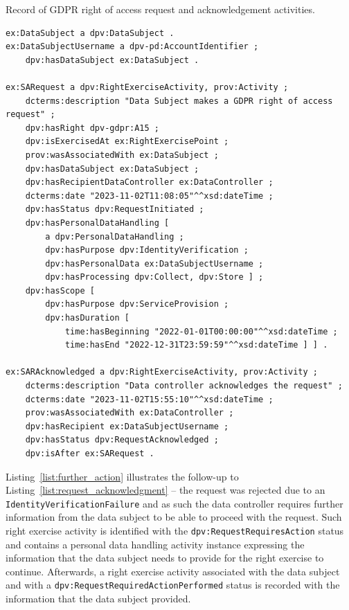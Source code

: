 \begin{listing}[htp]
\caption{Record of GDPR right of access request and acknowledgement activities.}
\label{list:request_acknowledgment}
\begin{verbatim}
ex:DataSubject a dpv:DataSubject .
ex:DataSubjectUsername a dpv-pd:AccountIdentifier ;
    dpv:hasDataSubject ex:DataSubject .

ex:SARequest a dpv:RightExerciseActivity, prov:Activity ;
    dcterms:description "Data Subject makes a GDPR right of access request" ;
    dpv:hasRight dpv-gdpr:A15 ;
    dpv:isExercisedAt ex:RightExercisePoint ;
    prov:wasAssociatedWith ex:DataSubject ;
    dpv:hasDataSubject ex:DataSubject ;
    dpv:hasRecipientDataController ex:DataController ;
    dcterms:date "2023-11-02T11:08:05"^^xsd:dateTime ;
    dpv:hasStatus dpv:RequestInitiated ;
    dpv:hasPersonalDataHandling [
        a dpv:PersonalDataHandling ;
        dpv:hasPurpose dpv:IdentityVerification ;
        dpv:hasPersonalData ex:DataSubjectUsername ;
        dpv:hasProcessing dpv:Collect, dpv:Store ] ;
    dpv:hasScope [
        dpv:hasPurpose dpv:ServiceProvision ;
        dpv:hasDuration [
            time:hasBeginning "2022-01-01T00:00:00"^^xsd:dateTime ;
            time:hasEnd "2022-12-31T23:59:59"^^xsd:dateTime ] ] .

ex:SARAcknowledged a dpv:RightExerciseActivity, prov:Activity ;
    dcterms:description "Data controller acknowledges the request" ;
    dcterms:date "2023-11-02T15:55:10"^^xsd:dateTime ;
    prov:wasAssociatedWith ex:DataController ;
    dpv:hasRecipient ex:DataSubjectUsername ;
    dpv:hasStatus dpv:RequestAcknowledged ;
    dpv:isAfter ex:SARequest .
\end{verbatim}
\end{listing}

Listing~\ref{list:further_action} illustrates the follow-up to Listing~\ref{list:request_acknowledgment} -- the request was rejected due to an \texttt{IdentityVerificationFailure} and as such the data controller requires further information from the data subject to be able to proceed with the request.
Such right exercise activity is identified with the \texttt{dpv:RequestRequiresAction} status and contains a personal data handling activity instance expressing the information that the data subject needs to provide for the right exercise to continue.
Afterwards, a right exercise activity associated with the data subject and with a \texttt{dpv:RequestRequiredActionPerformed} status is recorded with the information that the data subject provided.

